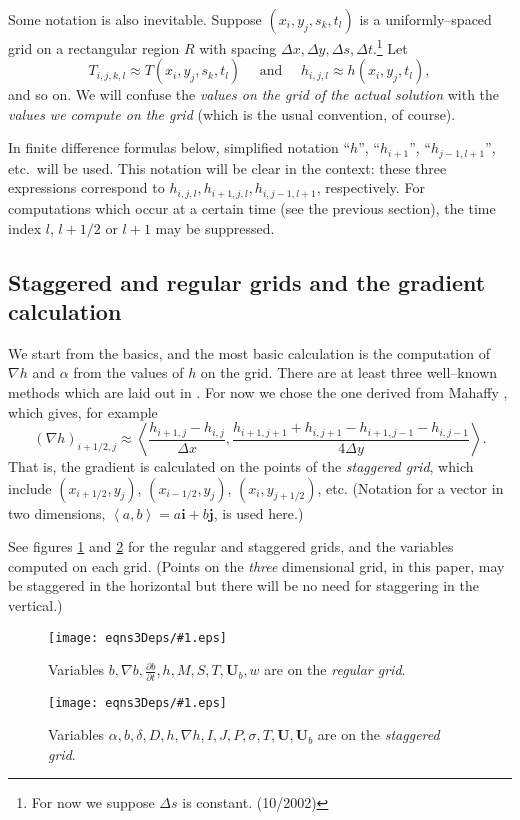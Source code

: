 \documentclass[12pt,final]{amsart}%
\theoremstyle{plain}
\theoremstyle{definition}
\theoremstyle{remark}
\newcommand{\regfigure}[2]{\texttt{[image: eqns3Deps/\#1.eps]}}
\newcommand{\ddt}[1]{\ensuremath{\frac{\partial #1}{\partial t}}}
\newcommand{\grad}{\nabla}
\newcommand{\ihat}{\mathbf{i}}
\newcommand{\ip}[2]{\ensuremath{\left<#1,#2\right>}}
\newcommand{\jhat}{\mathbf{j}}
\newcommand{\bU}{{\mathbf{U}}}
\begin{document}
Some notation is also inevitable.  Suppose $(x_i,y_j,s_k,t_l)$ is a uniformly--spaced grid on a rectangular region $R$ with spacing $\Delta x,\Delta y, \Delta s,\Delta t$.\footnote{For now we suppose $\Delta s$ is constant.  (10/2002)}  Let
    $$T_{i,j,k,l} \approx T(x_i,y_j,s_k,t_l) \quad \text{ and }\quad h_{i,j,l}\approx h(x_i,y_j,t_l),$$
and so on.  We will confuse the \emph{values on the grid of the actual solution} with the \emph{values we compute on the grid}  (which is the usual convention, of course).

In finite difference formulas below, simplified notation ``$h$'', ``$h_{i+1}$'', ``$h_{j-1,l+1}$'', etc.~will be used.  This notation will be clear in the context: these three expressions correspond to $h_{i,j,l},h_{i+1,j,l},h_{i,j-1,l+1}$, respectively.  For computations which occur at a certain time (see the previous section), the time index $l$, $l+1/2$ or $l+1$ may be suppressed.

\subsection*{Staggered and regular grids and the gradient calculation}  We start from the basics, and the most basic calculation is the computation of $\grad h$ and $\alpha$ from the values of $h$ on the grid.  There are at least three well--known methods which are laid out in \citep{HindmarshPayne}.  For now we chose the one derived from Mahaffy \citep{Mahaffy}, which gives, for example
    $$(\grad h)_{i+1/2,j} \approx \ip{\frac{h_{i+1,j}-h_{i,j}}{\Delta x}}{\frac{h_{i+1,j+1}+h_{i,j+1}-h_{i+1,j-1}-h_{i,j-1}}{4\Delta y}}.$$
That is, the gradient is calculated on the points of the \emph{staggered grid}, which include $(x_{i+1/2},y_j)$, $(x_{i-1/2},y_j)$, $(x_i,y_{j+1/2})$, etc.  (Notation for a vector in two dimensions, $\ip{a}{b}=a\ihat+b\jhat$, is used here.)

See figures \ref{regsten} and \ref{stagsten} for the regular and staggered grids, and the variables computed on each grid.  (Points on the \emph{three} dimensional grid, in this paper, may be staggered in the horizontal but there will be no need for staggering in the vertical.)

\begin{figure}[ht]
\regfigure{reggridsten}{2}
\caption{Variables $b, \grad b, \ddt{b}, h, M, S, T, \bU_b, w$ are on the \emph{regular grid}.}
\label{regsten}
\end{figure}

\begin{figure}[ht]
\regfigure{staggridsten}{2}
\vspace{-4mm}
\caption{Variables $\alpha, b, \delta, D, h, \grad h, I, J, P, \sigma, T, \bU, \bU_b$ are on the \emph{staggered grid}.}
\label{stagsten}
\end{figure}
\end{document}
